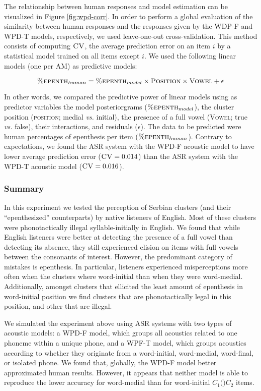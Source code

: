 {  The relationship between human responses and model estimation can be visualized in Figure \ref{fig:wpd-corr}. In order to perform a global evaluation of the similarity between human responses and the responses given by the WDP-F and WPD-T models, respectively, we used leave-one-out cross-validation. This method consists of computing $\textsc{CV}$, the average prediction error on an item $i$ by a statistical model trained on all items except $i$. We used the following linear models (one per AM) as predictive models:

  \begin{equation}
    \textsc{\%epenth}_{human} = \textsc{\%epenth}_{model} \times \textsc{Position} \times \textsc{Vowel} + \epsilon
  \end{equation}

  In other words, we compared the predictive power of linear models using as predictor variables the model posteriorgrams ($\textsc{\%epenth}_{model}$), the cluster position (\textsc{position}; medial \textit{vs.} initial), the presence of a full vowel (\textsc{Vowel}; true \textit{vs.} false), their interactions, and residuals ($\epsilon$). The data to be predicted were human percentages of epenthesis per item ($\textsc{\%epenth}_{human}$).
  Contrary to expectations, we found the ASR system with the WPD-F acoustic model to have lower average prediction error ($\textsc{CV} = 0.014$) than the ASR system with the WPD-T acoustic model ($\textsc{CV} = 0.016$).
  
\subsubsection{Summary}
In this experiment we tested the perception of Serbian clusters (and their ``epenthesized'' counterparts) by native listeners of English. Most of these clusters were phonotactically illegal syllable-initially in English. We found that while English listeners were better at detecting the presence of a full vowel than detecting its absence, they still experienced elision on items with full vowels between the consonants of interest. However, the predominant category of mistakes is epenthesis. In particular, listeners experienced misperceptions more often when the clusters where word-initial than when they were word-medial. Additionally, amongst clusters that ellicited the least amount of epenthesis in word-initial position we find clusters that are phonotactically legal in this position, and other that are illegal.

We simulated the experiment above using ASR systems with two types of acoustic models: a WPD-F model, which groups all acoustics related to one phoneme within a unique phone, and a WPF-T model, which groups acoustics according to whether they originate from a word-initial, word-medial, word-final, or isolated phone.
We found that, globally, the WPD-F model better approximated human results. However, it appears that neither model is able to reproduce the lower accuracy for word-medial than for word-initial $C_{1}($\textipa{[@]}$)C_{2}$ items.
  
}
